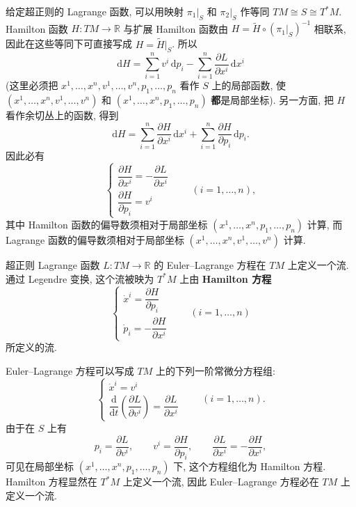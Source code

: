 给定超正则的 Lagrange 函数, 可以用映射 $\pi_1|_S$ 和 $\pi_2|_S$ 作等同 $TM\cong S\cong T^*M$. Hamilton 函数 $H:TM\to\mathbb{R}$ 与扩展 Hamilton 函数由 $H=\widetilde H\circ(\pi_1|_S)^{-1}$ 相联系, 因此在这些等同下可直接写成 $H=\widetilde H|_S$. 所以
\[
  \mathrm{d}H=\sum_{i=1}^n v^i\,\mathrm{d}p_i
  -\sum_{i=1}^n\frac{\partial L}{\partial x^i}\,\mathrm{d}x^i
\]
(这里必须把 $x^1,\ldots,x^n,v^1,\ldots,v^n,p_1,\ldots,p_n$ 看作 $S$ 上的局部函数, 使 $(x^1,\ldots,x^n,v^1,\ldots,v^n)$ 和 $(x^1,\ldots,x^n,p_1,\ldots,p_n)$ \textbf{都}是局部坐标). 另一方面, 把 $H$ 看作余切丛上的函数, 得到
\[
  \mathrm{d}H=\sum_{i=1}^n\frac{\partial H}{\partial x^i}\,\mathrm{d}x^i
  +\sum_{i=1}^n\frac{\partial H}{\partial p_i}\,\mathrm{d}p_i.
\]
因此必有
\[
  \begin{cases}
     \dfrac{\partial H}{\partial x^i}=-\dfrac{\partial L}{\partial x^i}\\[.6ex]
     \dfrac{\partial H}{\partial p_i}=v^i
  \end{cases}
  \qquad(i=1,\ldots,n),
\]
其中 Hamilton 函数的偏导数须相对于局部坐标 $(x^1,\ldots,x^n,p_1,\ldots,p_n)$ 计算, 而 Lagrange 函数的偏导数须相对于局部坐标 $(x^1,\ldots,x^n,v^1,\ldots,v^n)$ 计算.

\begin{RiemannProposition}\label{prop:legendre-conjugates-euler-lagrange-and-hamilton}
超正则 Lagrange 函数 $L:TM\to\mathbb{R}$ 的 Euler–Lagrange 方程在 $TM$ 上定义一个流. 通过 Legendre 变换, 这个流被映为 $T^*M$ 上由 \textbf{Hamilton 方程}
\[
  \begin{cases}
    \dot x^i=\dfrac{\partial H}{\partial p_i}\\[.6ex]
    \dot p_i=-\dfrac{\partial H}{\partial x^i}
  \end{cases}
  \qquad(i=1,\ldots,n)
\]
所定义的流.
\end{RiemannProposition}

\begin{RiemannProof}
Euler–Lagrange 方程可以写成 $TM$ 上的下列一阶常微分方程组:
\[
  \begin{cases}
    \dot x^i=v^i\\[.6ex]
    \dfrac{\mathrm{d}}{\mathrm{d}t}\left(\dfrac{\partial L}{\partial v^i}\right)
    =\dfrac{\partial L}{\partial x^i}
  \end{cases}
  \qquad(i=1,\ldots,n).
\]
由于在 $S$ 上有
\[
  p_i=\frac{\partial L}{\partial v^i},\qquad
  v^i=\frac{\partial H}{\partial p_i},\qquad
  \frac{\partial L}{\partial x^i}=-\frac{\partial H}{\partial x^i},
\]
可见在局部坐标 $(x^1,\ldots,x^n,p_1,\ldots,p_n)$ 下, 这个方程组化为 Hamilton 方程. Hamilton 方程显然在 $T^*M$ 上定义一个流, 因此 Euler–Lagrange 方程必在 $TM$ 上定义一个流.
\end{RiemannProof}

